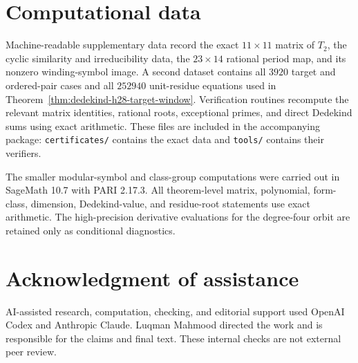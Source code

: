 \documentclass[11pt]{article}
\theoremstyle{definition}
\theoremstyle{remark}
\begin{document}
\appendix

\section{Computational data}

Machine-readable supplementary data record the exact $11\times11$ matrix of
$T_2$, the cyclic similarity and irreducibility data, the $23\times14$
rational period map, and its nonzero winding-symbol image.  A second dataset
contains all $3920$ target and ordered-pair cases and all $252940$
unit-residue equations used in Theorem~\ref{thm:dedekind-h28-target-window}.
Verification routines recompute the relevant matrix identities, rational
roots, exceptional primes, and direct Dedekind sums using exact arithmetic.
These files are included in the accompanying package: \texttt{certificates/}
contains the exact data and \texttt{tools/} contains their verifiers.

The smaller modular-symbol and class-group computations were carried out in
SageMath 10.7 with PARI 2.17.3.  All theorem-level matrix, polynomial,
form-class, dimension, Dedekind-value, and residue-root statements use exact
arithmetic.  The high-precision derivative evaluations for the degree-four
orbit are retained only as conditional diagnostics.

\section*{Acknowledgment of assistance}
AI-assisted research, computation, checking, and editorial support used
OpenAI Codex and Anthropic Claude. Luqman Mahmood directed the work
and is responsible for the claims and final text. These internal
checks are not external peer review.



\end{document}
